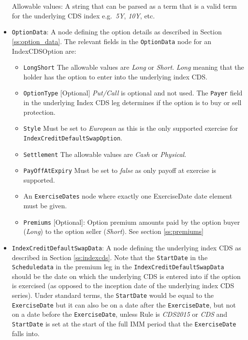 \begin{itemize}
Allowable values: A string that can be parsed as a term that is a valid term for the underlying CDS index e.g.\ \emph{5Y}, \emph{10Y}, etc.

\item
\lstinline!OptionData!: A node defining the option details as described in Section \ref{ss:option_data}. 
The relevant fields in the \lstinline!OptionData! node for an IndexCDSOption are:

\begin{itemize}
\item \lstinline!LongShort! The allowable values are \emph{Long} or \emph{Short}. \emph{Long} meaning that the holder has the option to enter into the underlying index CDS.

\item \lstinline!OptionType! [Optional] \emph{Put/Call} is optional and not used. The \lstinline!Payer! field in the underlying Index CDS leg  determines if the option is to buy or sell protection.

\item  \lstinline!Style!  Must be set to \emph{European} as this is the only supported exercise for \lstinline!IndexCreditDefaultSwapOption!. 

\item  \lstinline!Settlement! The allowable values are \emph{Cash} or \emph{Physical}.

\item \lstinline!PayOffAtExpiry! Must be set to \emph{false} as only payoff at exercise is supported.

\item An \lstinline!ExerciseDates! node where exactly one ExerciseDate date element must be given. 

\item  \lstinline!Premiums! [Optional]: Option premium amounts paid by the option buyer (\emph{Long}) to the option seller (\emph{Short}). See section \ref{ss:premiums}

\end{itemize}


\item
\lstinline!IndexCreditDefaultSwapData!: A node defining the underlying index CDS as described in Section \ref{ss:indexcds}. Note that the \lstinline!StartDate! in the \lstinline!Scheduledata! in the premium leg in the \lstinline!IndexCreditDefaultSwapData! should be the date on which the underlying CDS is entered into if the option is exercised (as opposed to the inception date of the underlying index CDS series). Under standard terms, the \lstinline!StartDate! would be equal to the \lstinline!ExerciseDate! but it can also be on a date after the \lstinline!ExerciseDate!, but not on a date before the  \lstinline!ExerciseDate!, unless Rule is \emph{CDS2015} or \emph{CDS} and \lstinline!StartDate! is set at the start of the full IMM period that the \lstinline!ExerciseDate! falls into. 


\end{itemize}
